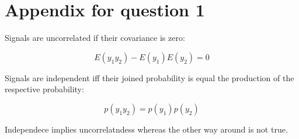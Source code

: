 \section{Appendix for question 1}

Signals are uncorrelated if their covariance is zero:

\begin{equation}\label{equati1}
E(y_{1}y_{2})-E(y_{1})E(y_{2})=0
\end{equation}

Signals are independent iff their joined probability is equal the production of the respective probability:

\begin{equation}\label{equati2}
p(y_{1}y_{2})=p(y_{1})p(y_{2})
\end{equation}


Independece implies uncorrelatndess whereas the other way around is not true. 